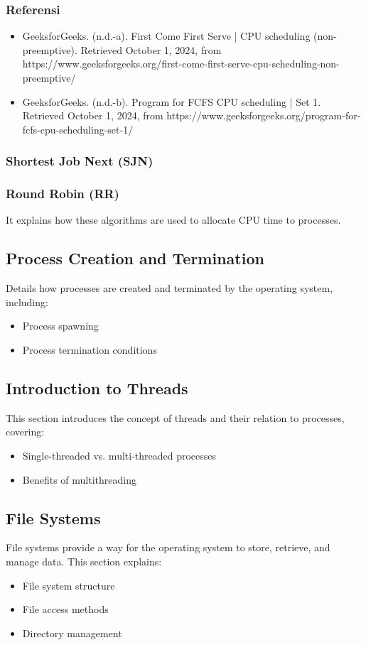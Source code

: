 \documentclass[12pt]{article}
\begin{document}
	\subsubsection*{Referensi}
	\begin{itemize}
		\item GeeksforGeeks. (n.d.-a). First Come First Serve | CPU scheduling (non-preemptive). Retrieved October 1, 2024, from https://www.geeksforgeeks.org/first-come-first-serve-cpu-scheduling-non-preemptive/
		
		\item GeeksforGeeks. (n.d.-b). Program for FCFS CPU scheduling | Set 1. Retrieved October 1, 2024, from https://www.geeksforgeeks.org/program-for-fcfs-cpu-scheduling-set-1/
	\end{itemize}
		
	\subsubsection{Shortest Job Next (SJN)}
	\subsubsection{Round Robin (RR)}
	It explains how these algorithms are used to allocate CPU time to processes.
	
	\subsection{Process Creation and Termination}
	Details how processes are created and terminated by the operating system, including:
	\begin{itemize}
		\item Process spawning
		\item Process termination conditions
	\end{itemize}
	
	\subsection{Introduction to Threads}
	This section introduces the concept of threads and their relation to processes, covering:
	\begin{itemize}
		\item Single-threaded vs. multi-threaded processes
		\item Benefits of multithreading
	\end{itemize}
	
	\subsection{File Systems}
	File systems provide a way for the operating system to store, retrieve, and manage data. This section explains:
	\begin{itemize}
		\item File system structure
		\item File access methods
		\item Directory management
	\end{itemize}
	
\end{document}
